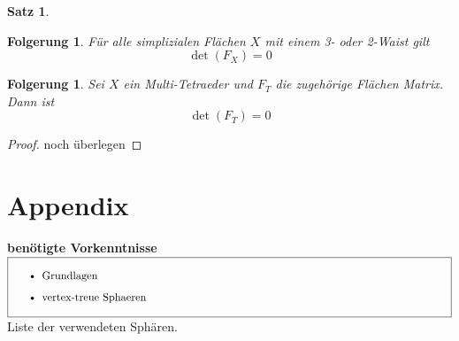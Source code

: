\documentclass[12pt,titlepage,twoside,cleardoublepage]{article}
\theoremstyle{nummermitklammern}
\newtheorem{folgerung}[temp]{Folgerung}
\newtheorem{satz}[temp]{Satz}
\newtheorem{folgerung}[zahl]{Folgerung}
\newtheorem{satz}[zahl]{Satz}
\numberwithin{equation}{section}
\begin{document}
\begin{satz}
\end{satz}
\begin{folgerung}
Für alle simplizialen Flächen $X$ mit einem 3- oder 2-Waist gilt 
\[
\det(F_X)=0
\]
\end{folgerung}
\begin{folgerung}
Sei $X$ ein Multi-Tetraeder und $F_T$ die zugehörige Flächen Matrix. Dann ist 
\[
\det(F_T)=0
\]
\end{folgerung}
\begin{proof}
noch überlegen
\end{proof}

\section*{Appendix}
\textbf{benötigte Vorkenntnisse} \\
$\fbox{
\parbox{14cm}{\begin{itemize}
\item Grundlagen
\item vertex-treue Sphaeren
\end{itemize}
}}$\\
Liste der verwendeten Sphären.


\pagestyle{empty}
\end{document}
